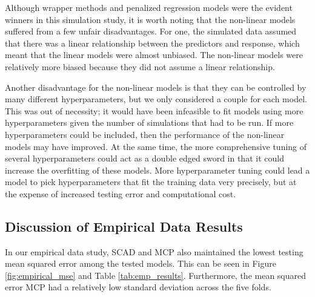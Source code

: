 \documentclass{article}
\begin{document}
	Although wrapper methods and penalized regression models were the evident winners in this simulation study, it is worth noting that the non-linear models suffered from a few unfair disadvantages. For one, the simulated data assumed that there was a linear relationship between the predictors and response, which meant that the linear models were almost unbiased. The non-linear models were relatively more biased because they did not assume a linear relationship. 
	
	Another disadvantage for the non-linear models is that they can be controlled by many different hyperparameters, but we only considered a couple for each model. This was out of necessity; it would have been infeasible to fit models using more hyperparameters given the number of simulations that had to be run. If more hyperparameters could be included, then the performance of the non-linear models may have improved. At the same time, the more comprehensive tuning of several hyperparameters could act as a double edged sword in that it could increase the overfitting of these models. More hyperparameter tuning could lead a model to pick hyperparameters that fit the training data very precisely, but at the expense of increased testing error and computational cost.
	
	\subsection{Discussion of Empirical Data Results}
	In our empirical data study, SCAD and MCP also maintained the lowest testing mean squared error among the tested models. This can be seen in Figure \ref{fig:empirical_mse} and Table \ref{tab:emp_results}. Furthermore, the mean squared error MCP had a relatively low standard deviation across the five folds. 

	
\end{document}
